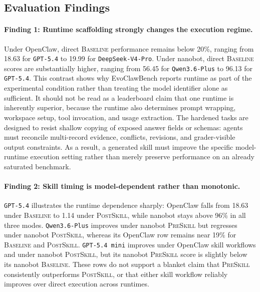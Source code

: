 \documentclass[11pt]{article}
\newcommand{\ours}{EvoClawBench}
\newcommand{\baseline}{\textsc{Baseline}}
\newcommand{\preskill}{\textsc{PreSkill}}
\newcommand{\postskill}{\textsc{PostSkill}}
\begin{document}
\subsection{Evaluation Findings}
\label{subsec:findings}

\paragraph{Finding 1: Runtime scaffolding strongly changes the execution regime.}
Under OpenClaw, direct \baseline{} performance remains below 20\%, ranging from 18.63 for \texttt{GPT-5.4} to 19.99 for \texttt{DeepSeek-V4-Pro}.
Under nanobot, direct \baseline{} scores are substantially higher, ranging from 56.45 for \texttt{Qwen3.6-Plus} to 96.13 for \texttt{GPT-5.4}.
This contrast shows why \ours{} reports runtime as part of the experimental condition rather than treating the model identifier alone as sufficient.
It should not be read as a leaderboard claim that one runtime is inherently superior, because the runtime also determines prompt wrapping, workspace setup, tool invocation, and usage extraction.
The hardened tasks are designed to resist shallow copying of exposed answer fields or schemas: agents must reconcile multi-record evidence, conflicts, revisions, and grader-visible output constraints.
As a result, a generated skill must improve the specific model-runtime execution setting rather than merely preserve performance on an already saturated benchmark.

\paragraph{Finding 2: Skill timing is model-dependent rather than monotonic.}
\texttt{GPT-5.4} illustrates the runtime dependence sharply: OpenClaw falls from 18.63 under \baseline{} to 1.14 under \postskill{}, while nanobot stays above 96\% in all three modes.
\texttt{Qwen3.6-Plus} improves under nanobot \preskill{} but regresses under nanobot \postskill{}, whereas its OpenClaw row remains near 19\% for \baseline{} and \postskill{}.
\texttt{GPT-5.4 mini} improves under OpenClaw skill workflows and under nanobot \postskill{}, but its nanobot \preskill{} score is slightly below its nanobot \baseline{}.
These rows do not support a blanket claim that \preskill{} consistently outperforms \postskill{}, or that either skill workflow reliably improves over direct execution across runtimes.
\end{document}

